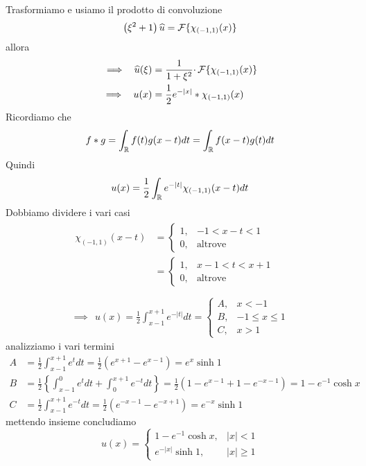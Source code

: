 Trasformiamo e usiamo il prodotto di convoluzione
\begin{equation*}
\left( \xi ^{2} +1\right)\widehat{u} =\mathcal{F} \{\chi _{( -1,1)}( x)\}
\end{equation*}
allora
\begin{align*}
\implies \ \ \widehat{u}( \xi ) & =\frac{1}{1+\xi ^{2}} \cdotp \mathcal{F} \{\chi _{( -1,1)}( x)\}\\
\implies \ \ u( x) & =\frac{1}{2} e^{-| x| } *\chi _{( -1,1)}( x)
\end{align*}
Ricordiamo che
\begin{equation*}
f*g=\int _{\mathbb{R} } f( t) g( x-t) dt=\int _{\mathbb{R} } f( x-t) g( t) dt
\end{equation*}
Quindi
\begin{equation*}
u( x) =\frac{1}{2}\int _{\mathbb{R} } e^{-| t| } \chi _{( -1,1)}( x-t) dt
\end{equation*}
Dobbiamo dividere i vari casi
\begin{gather*}
\begin{aligned}
\chi _{( -1,1)}( x-t) & =\begin{cases}
1, & -1< x-t< 1\\
0, & \text{altrove}
\end{cases}\\
 & =\begin{cases}
1, & x-1< t< x+1\\
0, & \text{altrove}
\end{cases}
\end{aligned}\\
\\
\implies \ \ u( x) =\frac{1}{2}\int ^{x+1}_{x-1} e^{-| t| } dt=\begin{cases}
A, & x< -1\\
B, & -1\leqslant x\leqslant 1\\
C, & x >1
\end{cases}
\end{gather*}
analizziamo i vari termini
\begin{align*}
A & =\frac{1}{2}\int ^{x+1}_{x-1} e^{t} dt=\frac{1}{2}\left( e^{x+1} -e^{x-1}\right) =e^{x}\sinh 1\\
B & =\frac{1}{2}\left\{\int ^{0}_{x-1} e^{t} dt+\int ^{x+1}_{0} e^{-t} dt\right\} =\frac{1}{2}\left( 1-e^{x-1} +1-e^{-x-1}\right) =1-e^{-1}\cosh x\\
C & =\frac{1}{2}\int ^{x+1}_{x-1} e^{-t} dt=\frac{1}{2}\left( e^{-x-1} -e^{-x+1}\right) =e^{-x}\sinh 1
\end{align*}
mettendo insieme concludiamo
\begin{equation*}
u( x) =\begin{cases}
1-e^{-1}\cosh x, & | x| < 1\\
e^{-| x| }\sinh 1, & | x| \geqslant 1
\end{cases}
\end{equation*}
